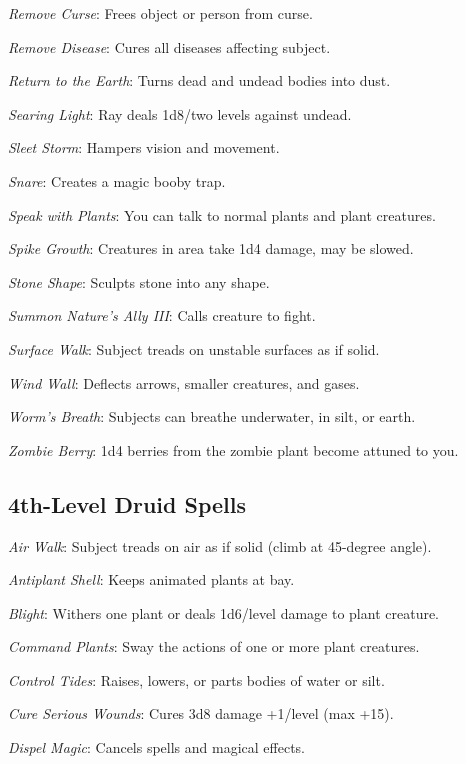 \textit{Remove Curse}: Frees object or person from curse.

\textit{Remove Disease}: Cures all diseases affecting subject.

\textit{Return to the Earth}: Turns dead and undead bodies into dust.

\textit{Searing Light}: Ray deals 1d8/two levels against undead.

\textit{Sleet Storm}: Hampers vision and movement.

\textit{Snare}: Creates a magic booby trap.

\textit{Speak with Plants}: You can talk to normal plants and plant creatures.

\textit{Spike Growth}: Creatures in area take 1d4 damage, may be slowed.

\textit{Stone Shape}: Sculpts stone into any shape.

\textit{Summon Nature's Ally III}: Calls creature to fight.

\textit{Surface Walk}: Subject treads on unstable surfaces as if solid.


\textit{Wind Wall}: Deflects arrows, smaller creatures, and gases.

\textit{Worm's Breath}: Subjects can breathe underwater, in silt, or earth.

\textit{Zombie Berry}: 1d4 berries from the zombie plant become attuned to you.



\subsection{4th-Level Druid Spells}

\textit{Air Walk}: Subject treads on air as if solid (climb at 45-degree angle).

\textit{Antiplant Shell}: Keeps animated plants at bay.

\textit{Blight}: Withers one plant or deals 1d6/level damage to plant creature.

\textit{Command Plants}: Sway the actions of one or more plant creatures.

\textit{Control Tides}: Raises, lowers, or parts bodies of water or silt.

\textit{Cure Serious Wounds}: Cures 3d8 damage +1/level (max +15).

\textit{Dispel Magic}: Cancels spells and magical effects.

